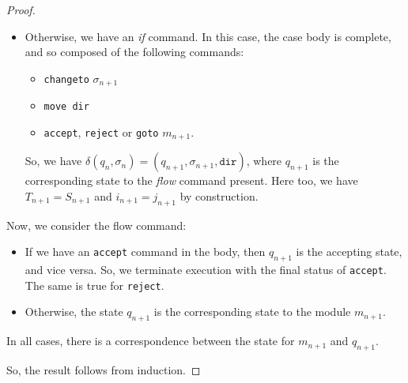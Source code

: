 \begin{appendices}
\begin{proof}
\begin{itemize}
\begin{itemize}
            \item Otherwise, we have an \textit{if} command. In this case, the case body is complete, and so composed of the following commands:
            \begin{itemize}
                \item \texttt{changeto} $\sigma_{n+1}$
                \item \texttt{move dir}
                \item \texttt{accept}, \texttt{reject} or \texttt{goto} $m_{n+1}$.
            \end{itemize}
            So, we have $\delta(q_n, \sigma_n) = (q_{n+1}, \sigma_{n+1}, \texttt{dir})$, where $q_{n+1}$ is the corresponding state to the \textit{flow} command present. Here too, we have $T_{n+1} = S_{n+1}$ and $i_{n+1} = j_{n+1}$ by construction. 
        \end{itemize}
        Now, we consider the flow command:
        \begin{itemize}
            \item If we have an \texttt{accept} command in the body, then $q_{n+1}$ is the accepting state, and vice versa. So, we terminate execution with the final status of \texttt{accept}. The same is true for \texttt{reject}. 
            \item Otherwise, the state $q_{n+1}$ is the corresponding state to the module $m_{n+1}$.
        \end{itemize}
        In all cases, there is a correspondence between the state for $m_{n+1}$ and $q_{n+1}$.   
    \end{itemize}
    So, the result follows from induction.
\end{proof}



\end{appendices}
